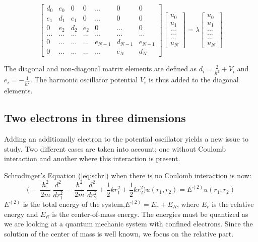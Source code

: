 \documentclass{article}
\begin{document}
\[
\begin{bmatrix}
	d_0 & e_0 & 0 & 0 & ... & 0 & 0 \\
	e_1 & d_1 & e_1 & 0 & ... & 0 & 0 \\
	0 & e_2 & d_2 & e_2 & 0 & ... & 0 \\
	... & ... & ... & ... & ... & ... & ... \\
	0 & ... & ... & ... & e_{N-1} & d_{N-1} & e_{N-1} \\
	0 & ... & ... & ... & ... & e_N & d_N
\end{bmatrix}
\begin{bmatrix}
	u_0 \\  u_1 \\ ... \\ ... \\ ... \\ u_N  
\end{bmatrix}
= \lambda
\begin{bmatrix}
    u_0 \\  u_1 \\ ... \\ ... \\ ... \\ u_N
\end{bmatrix}
\]


The diagonal and non-diagonal matrix elements are defined as $d_i = \frac{2}{h^2}+V_i$ and $e_i = -\frac{1}{h^2}$. The harmonic oscillator potential $V_i$ is thus added to the diagonal elements.

\subsection{Two electrons in three dimensions}
\label{sub:twoelec}

Adding an additionally electron to the potential oscillator yields a new issue to study. Two different cases are taken into account; one without Coulomb interaction and another where this interaction is present.  

\medskip

Schrodinger's Equation (\ref{eq:schr}) when there is no Coulomb interaction is now:
\begin{equation}
\bigg(-\frac{\hslash^2}{2m}\frac{d^2}{dr_1^2}-\frac{\hslash^2}{2m}\frac{d^2}{dr_2^2}+ \frac{1}{2}kr_1^2 + \frac{1}{2}kr_2^2\bigg)u(r_1,r_2) = E^{(2)}u(r_1,r_2)
\label{eq:schr2}
\end{equation}
$E^{(2)}$ is the total energy of the system,$E^{(2)} = E_r + E_R$, where $E_r$ is the relative energy and $E_R$ is the center-of-mass energy. The energies must be quantized as we are looking at a quantum mechanic system with confined electrons.  Since the solution of the center of mass is well known, we focus on the relative part. 
\end{document}
